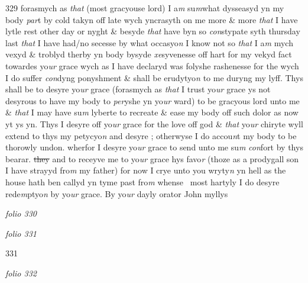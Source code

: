 \documentclass[12pt, a4paper]{book}
\begin{document}
{\color{Mahogany}329} forasmych as \textit{that} (most gracyouse lord) I a\textit{m} su\textit{m}what dysseasyd yn my body \textit{par}t by cold takyn off late wych yncrasyth on me more \& more \textit{that} I have lytle rest other day or nyght \& besyde \textit{that} have byn so \textit{con}stypate syth thursday last \textit{that} I have had/no secesse by what occasyo\textit{n} I know not so \textit{that} I a\textit{m} mych  vexyd \& troblyd therby yn body bysyde \textit{xe}syvenesse off hart for my vekyd fact towardes yo\textit{ur}
			grace wych as I have declaryd was folyshe rashenesse for the wych I do suffer \textit{con}dyng ponyshment \& shall be erudytyo\textit{n} to me duryng my lyff. Thys shall be to desyre yo\textit{ur} grace (forasmych as \textit{that} I trust yo\textit{ur} grace ys not desyrous to have my body to \textit{per}yshe yn yo\textit{ur} ward) to be gracyous lord unto me \& \textit{that} I may have su\textit{m} lyberte to recreate \& ease my body off such dolor as now yt ys yn. Thys I desyre off yo\textit{ur} grace for the love off god \& \textit{that} yo\textit{ur }chiryte  wyll extend to thys my petycyo\textit{n} and desyre ; otherwyse I do accou\textit{n}t my body to be thorowly undon. wherfor I desyre yo\textit{ur} grace to send unto me su\textit{m}
               \textit{con}fort by thys bearar. \sout{they }and to receyve me to yo\textit{ur} grace hys favo\textit{r} (thoze as a prodygall son I have strayyd fro\textit{m} my father) for now I crye unto you  wryty\textit{n} yn hell as the house hath ben callyd yn tyme past fro\textit{m} whense  most hartyly I do desyre rede\textit{m}ptyo\textit{n} by yo\textit{ur} grace.   By yo\textit{ur} dayly orator John myllys

\dotfill
					

\textit{folio 330}


         \vspace{4cm}
         
\dotfill
					

\textit{folio 331}


{\color{Mahogany}331}

\dotfill
					

\textit{folio 332}


         \vspace{4cm}
         
\end{document}
